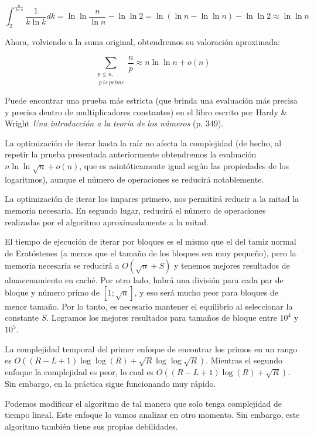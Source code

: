 $$\int_2^{\frac n {\ln n}} \frac 1 {k \ln k} dk = \ln \ln \frac n {\ln n} - \ln \ln 2 = \ln(\ln n - \ln \ln n) - \ln \ln 2 \approx \ln \ln n$$

Ahora, volviendo a la suma original, obtendremos su valoración aproximada:


$$\sum_{\substack{p \le n, \\\ p\ is\ prime}} \frac n p \approx n \ln \ln n + o(n)$$

Puede encontrar una prueba más estricta (que brinda una evaluación más precisa y precisa dentro de multiplicadores constantes) en el libro escrito por Hardy \& Wright \emph{Una introducción a la teoría de los números} (p. 349).

La optimización de iterar hasta la raíz no afecta la complejidad (de hecho, al repetir la prueba presentada anteriormente obtendremos la evaluación $n \ln \ln \sqrt n + o(n)$, que es asintóticamente igual según las propiedades de los logaritmos), aunque el número de operaciones se reducirá notablemente.

La optimización de iterar los impares primero, nos permitirá reducir a la mitad la memoria necesaria. En segundo lugar, reducirá el número de operaciones realizadas por el algoritmo aproximadamente a la mitad.

El tiempo de ejecución de iterar por bloques es el mismo que el del tamiz normal de Eratóstenes (a menos que el tamaño de los bloques sea muy pequeño), pero la memoria necesaria se reducirá a $O(\sqrt{n}+S)$ y tenemos mejores resultados de almacenamiento en caché. Por otro lado, habrá una división para cada par de bloque y número primo de $[1; \sqrt{n}]$, y eso será mucho peor para bloques de menor tamaño. Por lo tanto, es necesario mantener el equilibrio al seleccionar la constante $S$. Logramos los mejores resultados para tamaños de bloque entre $10^4$ y $10^5$.

La complejidad temporal del primer enfoque de encontrar los primos en un rango es $O((R-L+1) \log \log (R)+\sqrt R \log \log \sqrt R)$. Mientras el segundo enfoque  la complejidad es peor, lo cual es $O((R-L+1) \log (R)+\sqrt R)$. Sin embargo, en la práctica sigue funcionando muy rápido.  

Podemos modificar el algoritmo de tal manera que solo tenga complejidad de tiempo lineal. Este enfoque lo vamos analizar en otro momento. Sin embargo, este algoritmo también tiene sus propias debilidades.